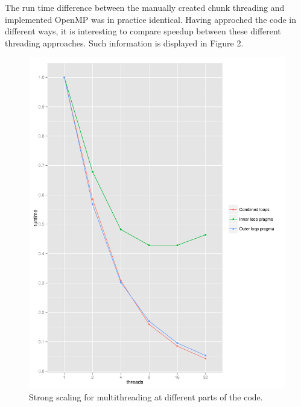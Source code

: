 \documentclass[12pt]{article}
\begin{document}
The run time difference between the manually created chunk threading and implemented OpenMP was in practice identical. Having approched the code in different ways, it is interesting to compare speedup between these different threading approaches. Such information is displayed in Figure 2.

\begin{figure}[]
	\centering
	\includegraphics[scale=0.5]{plot3}
	\caption{Strong scaling for multithreading at different parts of the code.}
	\label{fig:plot3}
\end{figure}
\end{document}
